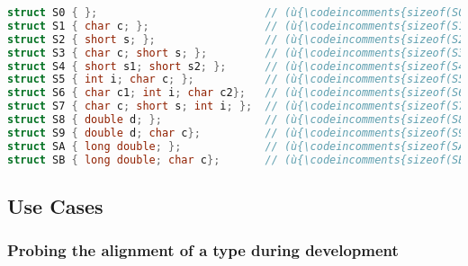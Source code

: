 \begin{lstlisting}[language=C++]
struct S0 { };                          // (ù{\codeincomments{sizeof(S0)}}ù) is  (ù{\codeincomments{1}}ù); (ù{\codeincomments{alignof(S0)}}ù) is  (ù{\codeincomments{1}}ù)
struct S1 { char c; };                  // (ù{\codeincomments{sizeof(S1)}}ù) is  (ù{\codeincomments{1}}ù); (ù{\codeincomments{alignof(S1)}}ù) is  (ù{\codeincomments{1}}ù)
struct S2 { short s; };                 // (ù{\codeincomments{sizeof(S2)}}ù) is  (ù{\codeincomments{2}}ù); (ù{\codeincomments{alignof(S2)}}ù) is  (ù{\codeincomments{2}}ù)
struct S3 { char c; short s; };         // (ù{\codeincomments{sizeof(S3)}}ù) is  (ù{\codeincomments{4}}ù); (ù{\codeincomments{alignof(S3)}}ù) is  (ù{\codeincomments{2}}ù)
struct S4 { short s1; short s2; };      // (ù{\codeincomments{sizeof(S4)}}ù) is  (ù{\codeincomments{4}}ù); (ù{\codeincomments{alignof(S4)}}ù) is  (ù{\codeincomments{2}}ù)
struct S5 { int i; char c; };           // (ù{\codeincomments{sizeof(S5)}}ù) is  (ù{\codeincomments{8}}ù); (ù{\codeincomments{alignof(S5)}}ù) is  (ù{\codeincomments{4}}ù)
struct S6 { char c1; int i; char c2};   // (ù{\codeincomments{sizeof(S6)}}ù) is (ù{\codeincomments{12}}ù); (ù{\codeincomments{alignof(S6)}}ù) is  (ù{\codeincomments{4}}ù)
struct S7 { char c; short s; int i; };  // (ù{\codeincomments{sizeof(S7)}}ù) is  (ù{\codeincomments{8}}ù); (ù{\codeincomments{alignof(S7)}}ù) is  (ù{\codeincomments{4}}ù)
struct S8 { double d; };                // (ù{\codeincomments{sizeof(S8)}}ù) is  (ù{\codeincomments{8}}ù); (ù{\codeincomments{alignof(S8)}}ù) is  (ù{\codeincomments{8}}ù)
struct S9 { double d; char c};          // (ù{\codeincomments{sizeof(S9)}}ù) is (ù{\codeincomments{16}}ù); (ù{\codeincomments{alignof(S9)}}ù) is  (ù{\codeincomments{8}}ù)
struct SA { long double; };             // (ù{\codeincomments{sizeof(SA)}}ù) is (ù{\codeincomments{16}}ù); (ù{\codeincomments{alignof(SA)}}ù) is (ù{\codeincomments{16}}ù)
struct SB { long double; char c};       // (ù{\codeincomments{sizeof(SB)}}ù) is (ù{\codeincomments{32}}ù); (ù{\codeincomments{alignof(SB)}}ù) is (ù{\codeincomments{16}}ù)
\end{lstlisting}
    

\subsection[Use Cases]{Use Cases}\label{use-cases}

\subsubsection[Probing the alignment of a type during development]{Probing the alignment of a type during development}\label{probing-the-alignment-of-a-type-during-development}

